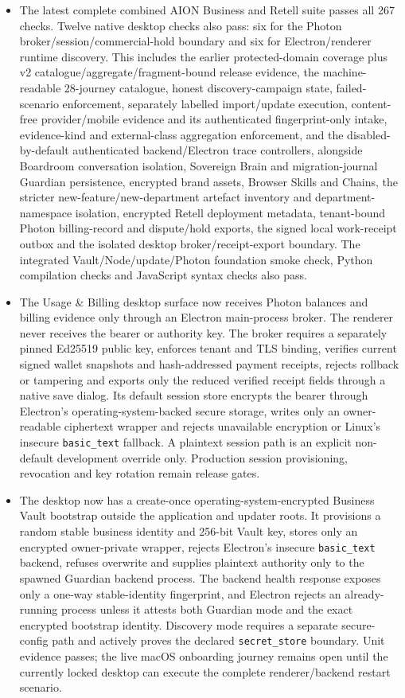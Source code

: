 \documentclass[11pt]{article}
\newcommand{\code}[1]{\texttt{#1}}
\begin{document}
\begin{itemize}
  \item The latest complete combined AION Business and Retell suite passes all 267 checks. Twelve native desktop checks also pass: six for the Photon broker/session/commercial-hold boundary and six for Electron/renderer runtime discovery. This includes the earlier protected-domain coverage plus v2 catalogue/aggregate/fragment-bound release evidence, the machine-readable 28-journey catalogue, honest discovery-campaign state, failed-scenario enforcement, separately labelled import/update execution, content-free provider/mobile evidence and its authenticated fingerprint-only intake, evidence-kind and external-class aggregation enforcement, and the disabled-by-default authenticated backend/Electron trace controllers, alongside Boardroom conversation isolation, Sovereign Brain and migration-journal Guardian persistence, encrypted brand assets, Browser Skills and Chains, the stricter new-feature/new-department artefact inventory and department-namespace isolation, encrypted Retell deployment metadata, tenant-bound Photon billing-record and dispute/hold exports, the signed local work-receipt outbox and the isolated desktop broker/receipt-export boundary. The integrated Vault/Node/update/Photon foundation smoke check, Python compilation checks and JavaScript syntax checks also pass.
  \item The Usage \& Billing desktop surface now receives Photon balances and billing evidence only through an Electron main-process broker. The renderer never receives the bearer or authority key. The broker requires a separately pinned Ed25519 public key, enforces tenant and TLS binding, verifies current signed wallet snapshots and hash-addressed payment receipts, rejects rollback or tampering and exports only the reduced verified receipt fields through a native save dialog. Its default session store encrypts the bearer through Electron's operating-system-backed secure storage, writes only an owner-readable ciphertext wrapper and rejects unavailable encryption or Linux's insecure \texttt{basic\_text} fallback. A plaintext session path is an explicit non-default development override only. Production session provisioning, revocation and key rotation remain release gates.
  \item The desktop now has a create-once operating-system-encrypted Business Vault bootstrap outside the application and updater roots. It provisions a random stable business identity and 256-bit Vault key, stores only an encrypted owner-private wrapper, rejects Electron's insecure \code{basic\_text} backend, refuses overwrite and supplies plaintext authority only to the spawned Guardian backend process. The backend health response exposes only a one-way stable-identity fingerprint, and Electron rejects an already-running process unless it attests both Guardian mode and the exact encrypted bootstrap identity. Discovery mode requires a separate secure-config path and actively proves the declared \code{secret\_store} boundary. Unit evidence passes; the live macOS onboarding journey remains open until the currently locked desktop can execute the complete renderer/backend restart scenario.

\end{itemize}
\end{document}

